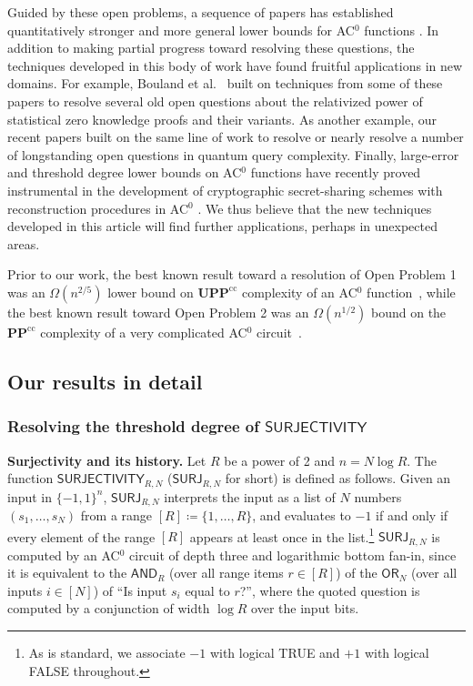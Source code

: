 \documentclass{toc}
\newcommand{\SURJ}{\mathsf{ SURJ}}
\newcommand{\OR}{\mathsf{ OR}}
\newcommand{\bits}{\{-1,1\}}
\newcommand{\PP}{\mathbf{PP}}
\newcommand{\UPP}{\mathbf{UPP}}
\newcommand{\AND}{\mathsf{AND}}
\begin{document}
Guided by these open problems, a sequence
of %
papers  %
has established quantitatively stronger and more general lower bounds for AC$^0$ functions \cite{bt13, bt14, sherstov14, sherstov15, dlweight, bt16, adegsurj}.
In addition to making partial progress toward resolving these questions, the techniques developed in %
this body of work  %
have found fruitful applications in new domains.
For example, Bouland et al.~\cite{bchtv} built on techniques from
%
some of these papers  %
\cite{bt13, bt14, sherstov14, bt16} to resolve several 
old open questions about the relativized power of statistical zero knowledge proofs and their variants.
%
As another example, our recent 
%
papers
\cite{adegsurj, bkt} built on the same line of work to
resolve or nearly resolve a number of longstanding open questions in quantum query complexity.
Finally, large-error and threshold degree lower bounds on AC$^0$ functions
have recently proved instrumental in the development of cryptographic secret-sharing
schemes with reconstruction procedures in AC$^0$ \cite{viola, bogicalp, cheng2017near}. We thus believe that the new techniques developed in this
%
article  %
will find %
further applications, perhaps in unexpected areas.


Prior to our work, the best known result toward a resolution of Open Problem 1 was an $\Omega(n^{2/5})$ lower
bound on $\UPP^{\text{cc}}$ complexity of an AC$^0$ function~\cite{bt16}, while 
the best known result toward Open Problem 2
was an $\Omega(n^{1/2})$ 
bound on the $\PP^{\text{cc}}$ complexity of a very complicated AC$^0$ circuit~\cite{sherstov15}. \label{sec:previoussec}

\label{s:openquestion1}

\subsection{Our results in detail}


\subsubsection{Resolving the threshold degree of
  \texorpdfstring{$\mathsf{SURJECTIVITY}$}{SURJECTIVITY}}
\label{surjoverview}
\noindent \textbf{Surjectivity and its history.} Let $R$ be a power of 2 and $n=N \log R$. The function $\mathsf{SURJECTIVITY}_{R, N}$ %
($\SURJ_{R, N}$ for short) is defined as follows. Given an input in $\bits^n$, $\SURJ_{R, N}$ interprets the input as a list of $N$ numbers $(s_1, \dots, s_N)$
from a range $[R]\coloneqq \{1, \dots, R\}$, and %
evaluates to $-1$ if and only if every element of the range $[R]$ appears at least once in the list.\footnote{As is standard, we associate $-1$ with logical TRUE and $+1$ with logical FALSE throughout.} $\SURJ_{R, N}$ is computed by an AC$^0$ circuit
of depth three and logarithmic bottom fan-in, since it is equivalent to the $\AND_R$ (over all range items $r \in [R]$) of the $\OR_N$ (over all inputs $i \in [N]$) of ``Is input $s_i$ equal to $r$?'', where the quoted question is computed by a conjunction of width $\log R$ over the input bits.
\end{document}
